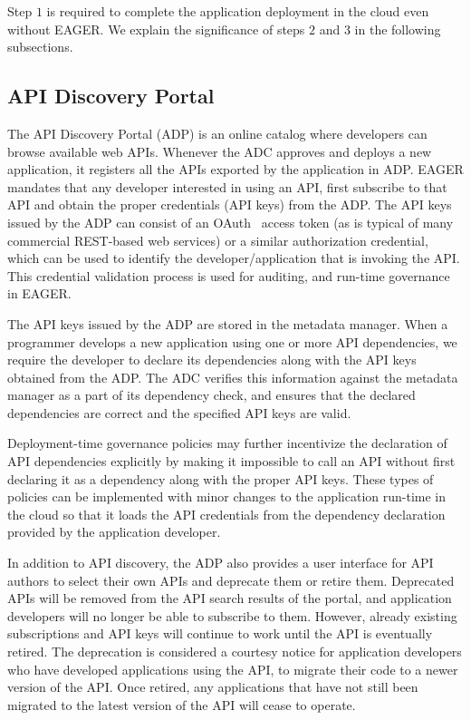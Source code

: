 Step $1$ is required to complete the application deployment in the cloud even
without EAGER. We explain the significance of steps $2$ and $3$ in the 
following subsections.

\subsection{API Discovery Portal} 
The API Discovery Portal (ADP) is an online
catalog where developers can browse available web APIs. Whenever the ADC
approves and deploys a new application, it registers all the APIs exported by
the application in ADP.  EAGER mandates that any developer interested in using
an API, first subscribe to that API and obtain the proper credentials (API
keys) from the ADP. The API keys issued by the ADP can consist of an
OAuth~\cite{oauth2}
access
token (as is typical of many commercial REST-based web services) 
or a similar authorization credential, which can be used to identify the
developer/application that is invoking the API. This credential
validation process is used for auditing, and run-time governance in EAGER.

The API keys issued by the ADP are stored in the metadata manager. When a
programmer develops a new application using one or more API dependencies, we
require the developer to declare its dependencies along with the API
keys obtained from the ADP. The ADC verifies this information against
the metadata manager as a part of its dependency check, and ensures that the
declared dependencies are correct and the specified API keys are valid. 

Deployment-time governance policies
may further incentivize the declaration of API 
dependencies explicitly by making it 
impossible to call an API without first declaring it as a dependency along
with the proper API keys. These types of policies can be implemented
with minor changes to the
application run-time in the cloud so that it loads the API credentials from
the dependency declaration provided by the application developer.

In addition to API discovery, the ADP also provides a user
interface for API authors to select their own APIs and deprecate them or
retire them. Deprecated APIs will be removed from the API search
results of the portal, and application developers will no longer be able to 
subscribe to them. However, already existing subscriptions and API keys will continue
to work until the API is eventually retired. 
The deprecation is considered a courtesy notice for application developers
who have developed applications using the API, to migrate their code to a newer version
of the API. 
Once retired, any applications that have
not still been migrated to the latest version of the API will cease to operate.

